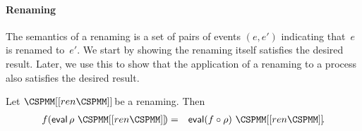 \paragraph{Renaming}

The semantics of a renaming is a set of pairs of events $(e,e')$ indicating
that~$e$ is renamed to~$e'$.  
We start by showing the renaming itself satisfies the desired result.  Later,
we use this to show that the application of a renaming to a process also
satisfies the desired result.  
%
\begin{lemma}
\label{lem:eval-renaming}
Let $\rename{ren}$ be a renaming.  Then 
\begin{eqnarray*}
f(\eval \rho~\rename{ren}) & = & \eval (f\after\rho)~ \rename{ren}.
\end{eqnarray*}
\end{lemma}
%

